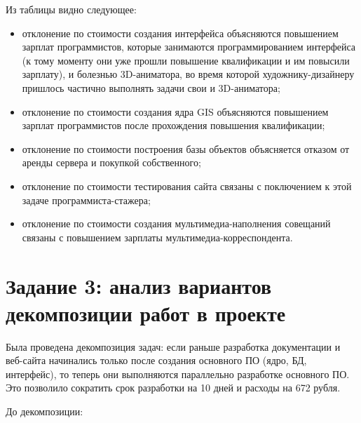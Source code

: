 Из таблицы видно следующее:

\begin{itemize}
	\item отклонение по стоимости создания интерфейса объясняются повышением зарплат программистов, которые занимаются программированием интерфейса (к тому моменту они уже прошли повышение квалификации и им повысили зарплату), и болезнью 3D-аниматора, во время которой художнику-дизайнеру пришлось частично выполнять задачи свои и 3D-аниматора;
	\item отклонение по стоимости создания ядра GIS объясняются повышением зарплат программистов после прохождения повышения квалификации;
	\item отклонение по стоимости построения базы объектов объясняется отказом от аренды сервера и покупкой собственного;
	\item отклонение по стоимости тестирования сайта связаны с поключением к этой задаче программиста-стажера;
	\item отклонение по стоимости создания мультимедиа-наполнения совещаний связаны с повышением зарплаты мультимедиа-корреспондента.
\end{itemize}

\section*{Задание 3: анализ вариантов декомпозиции работ в проекте}

Была проведена декомпозиция задач: если раньше разработка документации и веб-сайта начинались только после создания основного ПО (ядро, БД, интерфейс), то теперь они выполняются параллельно разработке основного ПО. Это позволило сократить срок разработки на 10 дней и расходы на 672 рубля.

До декомпозиции:


